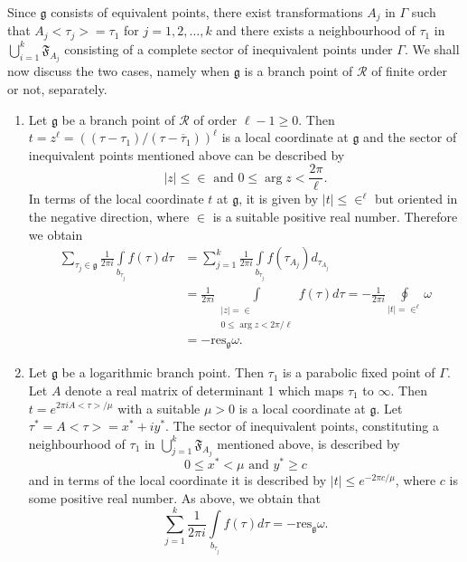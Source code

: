 Since $\mathfrak{g}$ consists of equivalent points, there exist
transformations $A_j$ in $\Gamma$ such that $A_j<\tau_j>=\tau_1$ for
$j=1,2,\ldots ,k$ and there exists a neighbourhood of $\tau_1$ in
$\bigcup^k_{i=1} \mathfrak{F}_{A_j}$ consisting of a complete sector
of inequivalent points under $\Gamma$. We shall now discuss the two
cases, namely when $\mathfrak{g}$ is a branch point of $\mathscr{R}$
of finite order or not, separately.
\begin{enumerate}
\item Let $\mathfrak{g}$ be a branch
point of $\mathscr{R}$ of order $\ell-1\geq 0$. Then $t=z^{\ell} =
((\tau-\tau_1)/(\tau-\overline{\tau}_1))^{\ell}$ is a local coordinate
at $\mathfrak{g}$ and the sector of inequivalent points mentioned
above can be described by 
$$
|z| \leq \in \text{ and } 0 \leq \arg z < \frac{2\pi}{\ell}.
$$
In terms of the local coordinate $t$ at $\mathfrak{g}$, it is given
by $|t|\leq \in^{\ell}$ but oriented in the negative
direction, where $\in$ is a suitable positive real
number. Therefore we obtain 
\begin{align*}
\sum_{\tau_j \in \mathfrak{g}} \frac{1}{2\pi i}
\int\limits_{b_{\tau_j}} f(\tau) d\tau & = \sum^k_{j=1} \frac{1}{2\pi
  i} \int\limits_{b_{\tau_j}} f(\tau_{A_j}) d_{\tau_{A_j}}\\
& = \frac{1}{2\pi i} \int\limits_{\substack{|z|=\in\\0\leq
    \arg z < 2 \pi/\ell}} f(\tau)d\tau = - \frac{1}{2\pi i}
\oint\limits_{|t|=\in^{\ell}}  \omega\\
& = - \text{res}_{\mathfrak{g}} \omega.
\end{align*}

\item Let $\mathfrak{g}$ be a logarithmic branch point. Then $\tau_1$
is a parabolic fixed point of $\Gamma$. Let $A$ denote a real matrix
of determinant 1 which maps $\tau_1$ to $\infty$. Then $t=e^{2\pi i
A<\tau>/\mu}$ with a suitable $\mu>0$ is a local coordinate at
 \pageoriginale $\mathfrak{g}$. Let
$\tau^{\ast}=A<\tau>=x^{\ast}+iy^{\ast}$. The sector of inequivalent
points, constituting a neighbourhood of $\tau_1$ in
$\bigcup^k_{j=1}\mathfrak{F}_{A_j}$ mentioned above, is described by 
$$
0\leq x^{\ast} < \mu \text{ and } y^{\ast} \geq c
$$
and in terms of the local coordinate it is described by $|t|\leq
e^{-2\pi c/\mu}$, where $c$ is some positive real number. As above, we
obtain that 
$$
\sum^k_{j=1} \frac{1}{2\pi i} \int\limits_{b_{\tau_j}} f(\tau) d\tau =
-\text{res}_{\mathfrak{g}} \omega.
$$
\end{enumerate}


